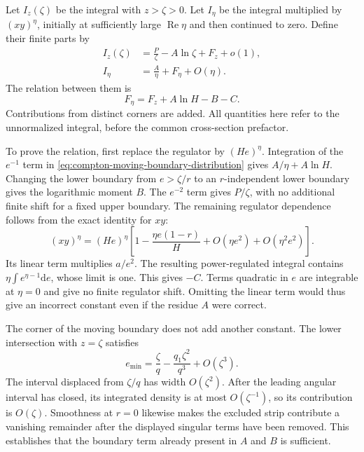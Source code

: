 Let $I_z(\zeta)$ be the integral with $z>\zeta>0$.  Let $I_\eta$ be the
integral multiplied by $(xy)^\eta$, initially at sufficiently large
$\operatorname{Re}\eta$ and then continued to zero.  Define their finite
parts by
\begin{align}
 I_z(\zeta)&=\frac{P}{\zeta}-A\ln\zeta+F_z+o(1),\\
 I_\eta&=\frac{A}{\eta}+F_\eta+O(\eta).
\end{align}
The relation between them is
\begin{equation}
 \boxed{F_\eta=F_z+A\ln H-B-C.}
 \label{eq:compton-general-soft-matching}
\end{equation}
Contributions from distinct corners are added.  All quantities here refer
to the unnormalized integral, before the common cross-section prefactor.

To prove the relation, first replace the regulator by $(He)^\eta$.
Integration of the $e^{-1}$ term in
\eqref{eq:compton-moving-boundary-distribution} gives $A/\eta+A\ln H$.
Changing the lower boundary from $e>\zeta/r$ to an $r$-independent lower
boundary gives the logarithmic moment $B$.  The $e^{-2}$ term gives
$P/\zeta$, with no additional finite shift for a fixed upper boundary.
The remaining regulator dependence follows from the exact identity for
$xy$:
\begin{equation}
 (xy)^\eta=(He)^\eta
 \left[1-\frac{\eta e(1-r)}{H}
 +O(\eta e^2)+O(\eta^2e^2)\right].
\end{equation}
Its linear term multiplies $a/e^2$.  The resulting power-regulated integral contains
$\eta\int e^{\eta-1}\mathrm{d}e$, whose limit is one.  This gives $-C$.
Terms quadratic in $e$ are integrable at $\eta=0$ and give no finite
regulator shift.  Omitting the linear term would thus give an incorrect
constant even if the residue $A$ were correct.

The corner of the moving boundary does not add another constant.
The lower intersection with $z=\zeta$ satisfies
\begin{equation}
 e_{\min}=\frac{\zeta}{q}-\frac{q_1\zeta^2}{q^3}
 +O(\zeta^3).
\end{equation}
The interval displaced from $\zeta/q$ has width $O(\zeta^2)$.
After the leading angular interval has closed, its integrated density
is at most $O(\zeta^{-1})$, so its contribution is $O(\zeta)$.
Smoothness at $r=0$ likewise makes the excluded strip contribute a
vanishing remainder after the displayed singular terms have been removed.
This establishes that the boundary term already present in $A$ and $B$
is sufficient.


